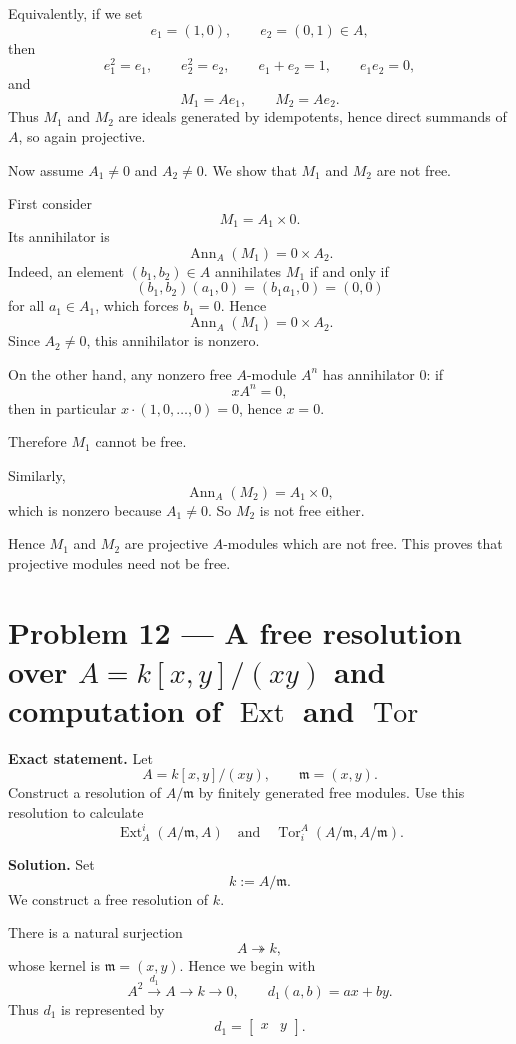 \documentclass[12pt,a4paper]{article}
\theoremstyle{plain}
\theoremstyle{definition}      %
\begin{document}
Equivalently, if we set
\[
e_1=(1,0),\qquad e_2=(0,1)\in A,
\]
then
\[
e_1^2=e_1,\qquad e_2^2=e_2,\qquad e_1+e_2=1,\qquad e_1e_2=0,
\]
and
\[
M_1=Ae_1,\qquad M_2=Ae_2.
\]
Thus \(M_1\) and \(M_2\) are ideals generated by idempotents, hence direct summands of \(A\), so again projective.

Now assume \(A_1\neq 0\) and \(A_2\neq 0\). We show that \(M_1\) and \(M_2\) are not free.

First consider
\[
M_1=A_1\times 0.
\]
Its annihilator is
\[
\operatorname{Ann}_A(M_1)=0\times A_2.
\]
Indeed, an element \((b_1,b_2)\in A\) annihilates \(M_1\) if and only if
\[
(b_1,b_2)(a_1,0)=(b_1a_1,0)=(0,0)
\]
for all \(a_1\in A_1\), which forces \(b_1=0\). Hence
\[
\operatorname{Ann}_A(M_1)=0\times A_2.
\]
Since \(A_2\neq 0\), this annihilator is nonzero.

On the other hand, any nonzero free \(A\)-module \(A^n\) has annihilator \(0\): if
\[
xA^n=0,
\]
then in particular \(x\cdot (1,0,\dots,0)=0\), hence \(x=0\).

Therefore \(M_1\) cannot be free.

Similarly,
\[
\operatorname{Ann}_A(M_2)=A_1\times 0,
\]
which is nonzero because \(A_1\neq 0\). So \(M_2\) is not free either.

Hence \(M_1\) and \(M_2\) are projective \(A\)-modules which are not free. This proves that projective modules need not be free.	
	
	
\section*{Problem 12 --- A free resolution over \texorpdfstring{$A=k[x,y]/(xy)$}{A = k[x,y]/(xy)} and computation of \texorpdfstring{$\operatorname{Ext}$}{Ext} and \texorpdfstring{$\operatorname{Tor}$}{Tor}}

\textbf{Exact statement.}
Let
\[
A=k[x,y]/(xy),\qquad \mathfrak m=(x,y).
\]
Construct a resolution of \(A/\mathfrak m\) by finitely generated free modules. Use this resolution to calculate
\[
\operatorname{Ext}_A^i(A/\mathfrak m,A)
\quad\text{and}\quad
\operatorname{Tor}_i^A(A/\mathfrak m,A/\mathfrak m).
\]

\textbf{Solution.}
Set
\[
k:=A/\mathfrak m.
\]
We construct a free resolution of \(k\).

There is a natural surjection
\[
A\twoheadrightarrow k,
\]
whose kernel is \(\mathfrak m=(x,y)\). Hence we begin with
\[
A^2 \xrightarrow{d_1} A \to k \to 0,
\qquad
d_1(a,b)=ax+by.
\]
Thus \(d_1\) is represented by
\[
d_1=\begin{bmatrix}x&y\end{bmatrix}.
\]
\end{document}
